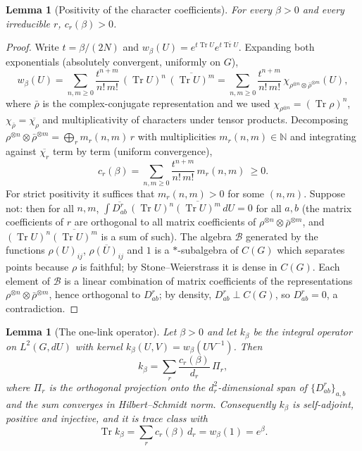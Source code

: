 \documentclass[11pt,a4paper]{article}
\newtheorem{lemma}[theorem]{Lemma}
\theoremstyle{definition}
\theoremstyle{remark}
\DeclareMathOperator{\Tr}{Tr}
\newcommand{\N}{\mathbb{N}}
\newcommand{\dU}{\,dU}
\begin{document}
\begin{lemma}[Positivity of the character coefficients]\label{lem:cr}
For every $\beta>0$ and every irreducible $r$, $c_r(\beta)>0$.
\end{lemma}

\begin{proof}
Write $t=\beta/(2N)$ and $w_\beta(U)=e^{t\Tr U}e^{t\overline{\Tr U}}$. Expanding both exponentials
(absolutely convergent, uniformly on $G$),
\[
w_\beta(U)=\sum_{n,m\ge0}\frac{t^{n+m}}{n!\,m!}\,(\Tr U)^n\,\overline{(\Tr U)^m}
=\sum_{n,m\ge0}\frac{t^{n+m}}{n!\,m!}\,\chi_{\rho^{\otimes n}\otimes\bar\rho^{\otimes m}}(U),
\]
where $\bar\rho$ is the complex-conjugate representation and we used $\chi_{\rho^{\otimes n}}=(\Tr\rho)^n$,
$\chi_{\bar\rho}=\overline{\chi_\rho}$ and multiplicativity of characters under tensor products. Decomposing
$\rho^{\otimes n}\otimes\bar\rho^{\otimes m}=\bigoplus_r m_r(n,m)\,r$ with multiplicities $m_r(n,m)\in\N$
and integrating against $\overline{\chi_r}$ term by term (uniform convergence),
\[
c_r(\beta)=\sum_{n,m\ge0}\frac{t^{n+m}}{n!\,m!}\,m_r(n,m)\ \ge 0 .
\]
For strict positivity it suffices that $m_r(n,m)>0$ for some $(n,m)$. Suppose not: then for all $n,m$,
$\int\overline{D^r_{ab}}\,(\Tr U)^n\overline{(\Tr U)^m}\dU=0$ for all $a,b$ (the matrix coefficients of $r$ are
orthogonal to all matrix coefficients of $\rho^{\otimes n}\otimes\bar\rho^{\otimes m}$, and $(\Tr U)^n\overline{(\Tr U)^m}$
is a sum of such). The algebra $\mathcal{B}$ generated by the functions $\rho(U)_{ij}$, $\overline{\rho(U)_{ij}}$ and $1$
is a $*$-subalgebra of $C(G)$ which separates points because $\rho$ is faithful; by Stone--Weierstrass it is
dense in $C(G)$. Each element of $\mathcal{B}$ is a linear combination of matrix coefficients of the
representations $\rho^{\otimes n}\otimes\bar\rho^{\otimes m}$, hence orthogonal to $D^r_{ab}$; by density,
$D^r_{ab}\perp C(G)$, so $D^r_{ab}=0$, a contradiction.
\end{proof}

\begin{lemma}[The one-link operator]\label{lem:kop}
Let $\beta>0$ and let $k_\beta$ be the integral operator on $L^2(G,dU)$ with kernel $k_\beta(U,V)=w_\beta(UV^{-1})$. Then
\begin{equation}\label{eq:kop}
k_\beta=\sum_r\frac{c_r(\beta)}{d_r}\,\Pi_r ,
\end{equation}
where $\Pi_r$ is the orthogonal projection onto the $d_r^2$-dimensional span of $\{D^r_{ab}\}_{a,b}$ and the
sum converges in Hilbert--Schmidt norm. Consequently $k_\beta$ is self-adjoint, positive and injective, and it is
trace class with
\begin{equation}\label{eq:trace}
\Tr k_\beta=\sum_r c_r(\beta)\,d_r=w_\beta(1)=e^{\beta}.
\end{equation}
\end{lemma}
\end{document}
